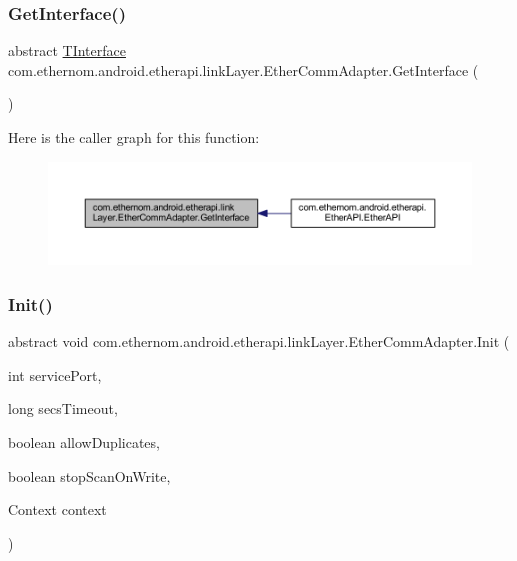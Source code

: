 \subsubsection{\texorpdfstring{Get\+Interface()}{GetInterface()}}
{\footnotesize\ttfamily abstract \mbox{\hyperlink{enumcom_1_1ethernom_1_1android_1_1etherapi_1_1link_layer_1_1_t_interface}{T\+Interface}} com.\+ethernom.\+android.\+etherapi.\+link\+Layer.\+Ether\+Comm\+Adapter.\+Get\+Interface (\begin{DoxyParamCaption}{ }\end{DoxyParamCaption})\hspace{0.3cm}{\ttfamily [abstract]}}

Here is the caller graph for this function\+:\nopagebreak
\begin{figure}[H]
\begin{center}
\leavevmode
\includegraphics[width=350pt]{classcom_1_1ethernom_1_1android_1_1etherapi_1_1link_layer_1_1_ether_comm_adapter_ad6522d7705f367397d96990212ce4811_icgraph}
\end{center}
\end{figure}
\mbox{\label{classcom_1_1ethernom_1_1android_1_1etherapi_1_1link_layer_1_1_ether_comm_adapter_a165ef052bf2b43fd4cfb6d058782dc56}} 
\subsubsection{\texorpdfstring{Init()}{Init()}}
{\footnotesize\ttfamily abstract void com.\+ethernom.\+android.\+etherapi.\+link\+Layer.\+Ether\+Comm\+Adapter.\+Init (\begin{DoxyParamCaption}\item[{int}]{service\+Port,  }\item[{long}]{secs\+Timeout,  }\item[{boolean}]{allow\+Duplicates,  }\item[{boolean}]{stop\+Scan\+On\+Write,  }\item[{Context}]{context }\end{DoxyParamCaption})\hspace{0.3cm}{\ttfamily [abstract]}}

